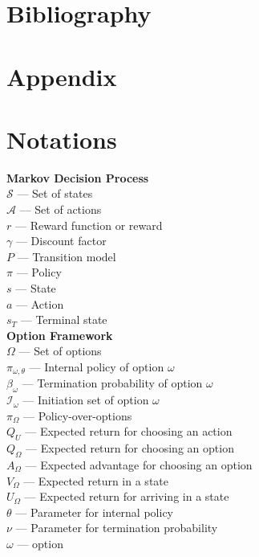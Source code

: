 \documentclass{article}
\begin{document}
	\section*{Bibliography}
	
	
		
	\section*{Appendix}
	\appendix
	\section{Notations}
	{\bfseries Markov Decision Process}\\
	$\mathcal{S}$ --- Set of states\\
	$\mathcal{A}$ --- Set of actions\\
	$r$ --- Reward function or reward\\
	$\gamma$ --- Discount factor\\
	$P$ --- Transition model\\
	$\pi$ --- Policy\\
	$s$ --- State\\
	$a$ --- Action\\
	$s_T$ --- Terminal state\vspace{0.1in}\\
	{\bfseries Option Framework}\\
	$\Omega$ --- Set of options\\
	$\pi_{\omega,\theta}$ --- Internal policy of option $\omega$\\
	$\beta_\omega$ --- Termination probability of option $\omega$\\
	$\mathcal{I}_\omega$ --- Initiation set of option $\omega$\\
	$\pi_\Omega$ --- Policy-over-options\\
	$Q_U$ --- Expected return for choosing an action\\
	$Q_\Omega$ --- Expected return for choosing an option\\
	$A_\Omega$ --- Expected advantage for choosing an option\\
	$V_\Omega$ --- Expected return in a state\\
	$U_\Omega$ --- Expected return for arriving in a state\\
	$\theta$ --- Parameter for internal policy\\
	$\nu$ --- Parameter for termination probability\\
	$\omega$ --- option\vspace{0.1in}\\
\end{document}
